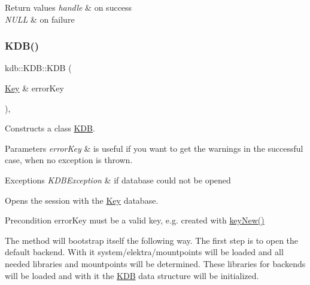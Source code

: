 \begin{DoxyRetVals}{Return values}
{\em handle} & on success \\
\hline
{\em N\+U\+LL} & on failure \\
\hline
\end{DoxyRetVals}
\mbox{\label{classkdb_1_1KDB_a98e25c7fe2f47c5a90461676c6d219e7}} 
\subsubsection{\texorpdfstring{K\+D\+B()}{KDB()}\hspace{0.1cm}{\footnotesize\ttfamily [2/2]}}
{\footnotesize\ttfamily kdb\+::\+K\+D\+B\+::\+K\+DB (\begin{DoxyParamCaption}\item[{\hyperlink{classkdb_1_1Key}{Key} \&}]{error\+Key }\end{DoxyParamCaption})\hspace{0.3cm}{\ttfamily [inline]}, {\ttfamily [explicit]}}



Constructs a class \hyperlink{classkdb_1_1KDB}{K\+DB}. 


\begin{DoxyParams}{Parameters}
{\em error\+Key} & is useful if you want to get the warnings in the successful case, when no exception is thrown.\\
\hline
\end{DoxyParams}

\begin{DoxyExceptions}{Exceptions}
{\em K\+D\+B\+Exception} & if database could not be opened\\
\hline
\end{DoxyExceptions}
Opens the session with the \hyperlink{classkdb_1_1Key}{Key} database. \begin{DoxyPrecond}{Precondition}
error\+Key must be a valid key, e.\+g. created with \hyperlink{group__key_gad23c65b44bf48d773759e1f9a4d43b89}{key\+New()}
\end{DoxyPrecond}
The method will bootstrap itself the following way. The first step is to open the default backend. With it system/elektra/mountpoints will be loaded and all needed libraries and mountpoints will be determined. These libraries for backends will be loaded and with it the {\ttfamily \hyperlink{classkdb_1_1KDB}{K\+DB}} data structure will be initialized.

